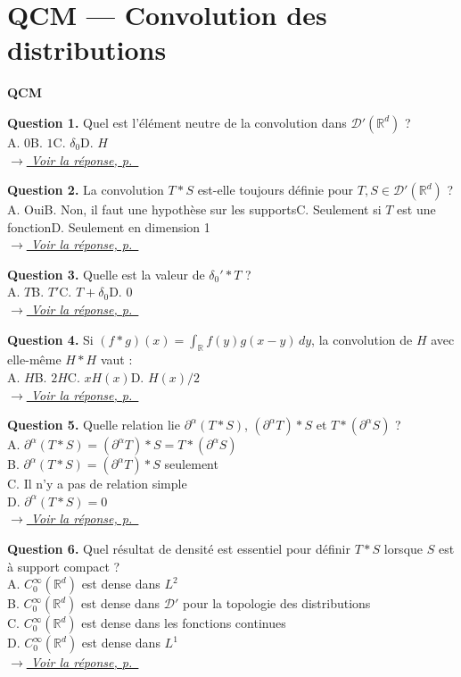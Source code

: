 \documentclass[12pt,a4paper,openany]{book}
\theoremstyle{definition}
\theoremstyle{plain}
\theoremstyle{remark}
\newenvironment{qcmblock}{%
	\begin{mdframed}[linewidth=0.5pt, linecolor=black!35,
		backgroundcolor=gray!5,
		skipabove=12pt, skipbelow=12pt,
		innerleftmargin=12pt, innerrightmargin=8pt,
		innertopmargin=8pt, innerbottommargin=8pt]%
		\noindent\textbf{\scshape QCM}\par\smallskip%
	}{%
	\end{mdframed}%
}
\newcommand{\navtoQCMRep}[2]{%
	\vspace{2pt}%
	\noindent\hfill{\small\itshape%
		\hyperlink{qcmrep:#1:q#2}{$\rightarrow$ Voir la réponse, p.~\pageref*{qcmrep:#1:q#2}}%
	}%
	\vspace{6pt}%
}
\begin{document}
	\section{QCM — Convolution des distributions}
	\begin{qcmblock}
		\hypertarget{qcm:ch6:start}{}\label{qcm:ch6:start}
		\hypertarget{qcm:ch6:q1}{}\label{qcm:ch6:q1}
		\textbf{Question 1.} Quel est l'élément neutre de la convolution dans $\mathcal{D}'(\mathbb{R}^d)$ ?\\
		A. $0$\quad B. $1$\quad C. $\delta_0$\quad D. $H$\\
		\navtoQCMRep{ch6}{1}
		
		\medskip
		\hypertarget{qcm:ch6:q2}{}\label{qcm:ch6:q2}
		\textbf{Question 2.} La convolution $T * S$ est-elle toujours définie pour $T, S \in \mathcal{D}'(\mathbb{R}^d)$ ?\\
		A. Oui\quad B. Non, il faut une hypothèse sur les supports\quad C. Seulement si $T$ est une fonction\quad D. Seulement en dimension 1\\
		\navtoQCMRep{ch6}{2}
		
		\medskip
		\hypertarget{qcm:ch6:q3}{}\label{qcm:ch6:q3}
		\textbf{Question 3.} Quelle est la valeur de $\delta_0' * T$ ?\\
		A. $T$\quad B. $T'$\quad C. $T + \delta_0$\quad D. $0$\\
		\navtoQCMRep{ch6}{3}
		
		\medskip
		\hypertarget{qcm:ch6:q4}{}\label{qcm:ch6:q4}
		\textbf{Question 4.} Si $(f * g)(x) = \int_{\mathbb{R}} f(y)g(x-y)\,dy$, la convolution de $H$ avec elle-même $H * H$ vaut :\\
		A. $H$\quad B. $2H$\quad C. $xH(x)$\quad D. $H(x)/2$\\
		\navtoQCMRep{ch6}{4}
		
		\medskip
		\hypertarget{qcm:ch6:q5}{}\label{qcm:ch6:q5}
		\textbf{Question 5.} Quelle relation lie $\partial^\alpha(T*S)$, $(\partial^\alpha T)*S$ et $T*(\partial^\alpha S)$ ?\\
		A. $\partial^\alpha(T*S) = (\partial^\alpha T)*S = T*(\partial^\alpha S)$\\
		B. $\partial^\alpha(T*S) = (\partial^\alpha T)*S$ seulement\\
		C. Il n'y a pas de relation simple\\
		D. $\partial^\alpha(T*S) = 0$\\
		\navtoQCMRep{ch6}{5}
		
		\medskip
		\hypertarget{qcm:ch6:q6}{}\label{qcm:ch6:q6}
		\textbf{Question 6.} Quel résultat de densité est essentiel pour définir $T * S$ lorsque $S$ est à support compact ?\\
		A. $C_0^\infty(\mathbb{R}^d)$ est dense dans $L^2$\\
		B. $C_0^\infty(\mathbb{R}^d)$ est dense dans $\mathcal{D}'$ pour la topologie des distributions\\
		C. $C_0^\infty(\mathbb{R}^d)$ est dense dans les fonctions continues\\
		D. $C_0^\infty(\mathbb{R}^d)$ est dense dans $L^1$\\
		\navtoQCMRep{ch6}{6}
		

\end{qcmblock}
\end{document}
